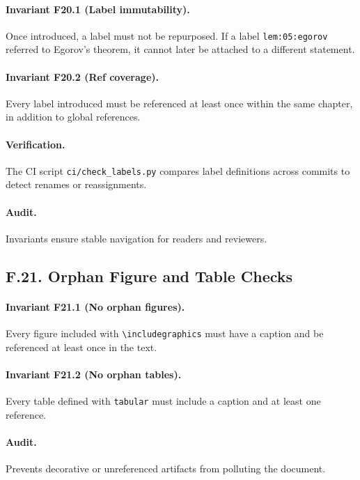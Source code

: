 \paragraph{Invariant F20.1 (Label immutability).} Once introduced, a label must not be repurposed. If a label \texttt{lem:05:egorov} referred to Egorov’s theorem, it cannot later be attached to a different statement.

\paragraph{Invariant F20.2 (Ref coverage).} Every label introduced must be referenced at least once within the same chapter, in addition to global references.

\paragraph{Verification.} The CI script \texttt{ci/check\_labels.py} compares label definitions across commits to detect renames or reassignments.

\paragraph{Audit.} Invariants ensure stable navigation for readers and reviewers.

\subsection*{F.21. Orphan Figure and Table Checks}

\paragraph{Invariant F21.1 (No orphan figures).} Every figure included with \texttt{\textbackslash includegraphics} must have a caption and be referenced at least once in the text.

\paragraph{Invariant F21.2 (No orphan tables).} Every table defined with \texttt{tabular} must include a caption and at least one reference.

\paragraph{Audit.} Prevents decorative or unreferenced artifacts from polluting the document.

